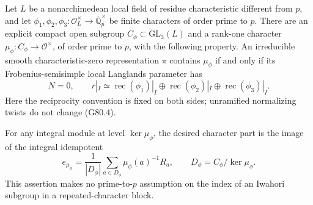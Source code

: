 \begin{proposition}
\label{prop:G80-type}
Let \(L\) be a nonarchimedean local field of residue characteristic
different from \(p\), and let
\(\phi_1,\phi_2,\phi_3:\mathcal O_L^\times\to\overline{\mathbb Q}_p^\times\)
be finite characters of order prime to \(p\).
There are an explicit compact open subgroup \(C_\phi\subset
\mathrm{GL}_3(L)\) and a rank-one character
\(\mu_\phi:C_\phi\to\mathcal O^\times\), of order prime to \(p\), with the
following property.  An irreducible smooth characteristic-zero
representation \(\pi\) contains \(\mu_\phi\) if and only if its
Frobenius-semisimple local Langlands parameter has
\[
 N=0,\qquad r|_I\simeq
 \operatorname{rec}(\phi_1)|_I\oplus
 \operatorname{rec}(\phi_2)|_I\oplus
 \operatorname{rec}(\phi_3)|_I.                    \tag{G80.4}
\]
Here the reciprocity convention is fixed on both sides; unramified
normalizing twists do not change (G80.4).

For any integral module at level \(\ker\mu_\phi\), the desired character
part is the image of the integral idempotent
\[
 e_{\mu_\phi}=\frac1{|D_\phi|}
       \sum_{a\in D_\phi}\mu_\phi(a)^{-1}R_a,\qquad
 D_\phi=C_\phi/\ker\mu_\phi.                       \tag{G80.5}
\]
This assertion makes no prime-to-\(p\) assumption on the index of an
Iwahori subgroup in a repeated-character block.
\end{proposition}

